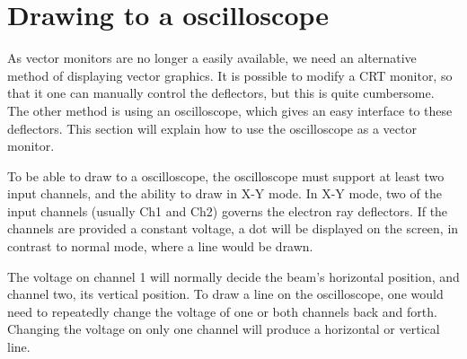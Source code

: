 \section{Drawing to a oscilloscope}
As vector monitors are no longer a easily available, we need an alternative method of displaying vector graphics. It is possible to modify a CRT monitor, so that it one can manually control the deflectors, but this is quite cumbersome. The other method is using an oscilloscope, which gives an easy interface to these deflectors. This section will explain how to use the oscilloscope as a vector monitor.


To be able to draw to a oscilloscope, the oscilloscope must support at least two input channels, and the ability to draw in X-Y mode. In X-Y mode, two of the input channels (usually Ch1 and Ch2) governs the electron ray deflectors. If the channels are provided a constant voltage, a dot will be displayed on the screen, in contrast to normal mode, where  a line would be drawn.

The voltage on channel 1 will normally decide the beam's horizontal position, and channel two, its vertical position. To draw a line on the oscilloscope, one would need to repeatedly change the voltage of one or both channels back and forth.  Changing the voltage on only one channel will produce a horizontal or vertical line. 

